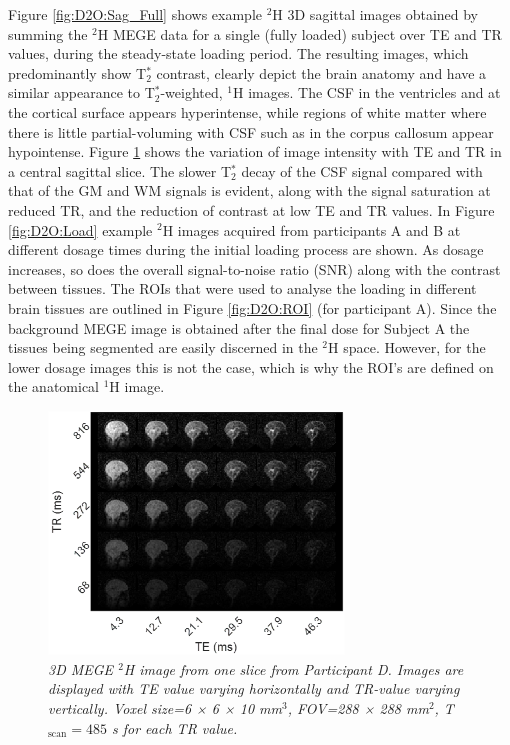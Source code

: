 \documentclass[class=article, crop=false]{standalone}
\begin{document}
Figure \ref{fig:D2O:Sag_Full} shows example $^2$H 3D sagittal images obtained by summing the $^2$H MEGE data for a single (fully loaded) subject over TE and TR values, during the steady-state loading period. The resulting images, which predominantly show T$_2^*$ contrast, clearly depict the brain anatomy and have a similar appearance to T$_2^*$-weighted, $^1$H images. The CSF in the ventricles and at the cortical surface appears hyperintense, while regions of white matter where there is little partial-voluming with CSF such as in the corpus callosum appear hypointense. Figure \ref{fig:D2O:TR_TE} shows the variation of image intensity with TE and TR in a central sagittal slice. The slower T$_2^*$ decay of the CSF signal compared with that of the GM and WM signals is evident, along with the signal saturation at reduced TR, and the reduction of contrast at low TE and TR values. In Figure \ref{fig:D2O:Load} example $^2$H images acquired from participants A and B at different dosage times during the initial loading process are shown. As dosage increases, so does the overall signal-to-noise ratio (SNR) along with the contrast between tissues. The ROIs that were used to analyse the loading in different brain tissues are outlined in Figure \ref{fig:D2O:ROI} (for participant A). Since the background MEGE image is obtained after the final dose for Subject A the tissues being segmented are easily discerned in the $^2$H space. However, for the lower dosage images this is not the case, which is why the ROI’s are defined on the anatomical $^1$H image. 

\begin{figure}[H]
    \centering
    \includegraphics[width = 0.7\textwidth]{Figures/D2O/TR_TE.png}
    \caption{\textit{3D MEGE $^2$H image from one slice from Participant D. Images are displayed with TE value varying horizontally and TR-value varying vertically. Voxel size=6 × 6 × 10 mm$^3$, FOV=288 × 288 mm$^2$, T$_\textrm{scan}=485$ s for each TR value.}}
    \label{fig:D2O:TR_TE}
\end{figure}
\end{document}
